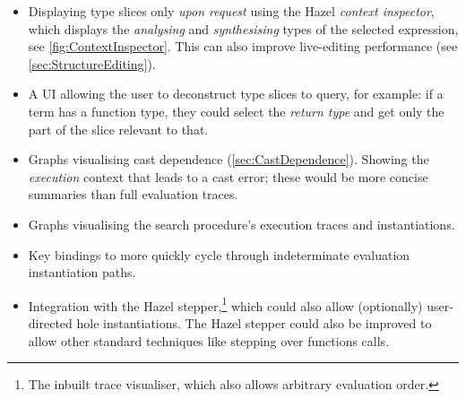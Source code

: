 \begin{itemize}
\item Displaying type slices only \textit{upon request} using the Hazel \textit{context inspector}, which displays the \textit{analysing} and \textit{synthesising} types of the selected expression, see \cref{fig:ContextInspector}. This can also improve live-editing performance (see \cref{sec:StructureEditing}).
\item A UI allowing the user to deconstruct type slices to query, for example: if a term has a function type, they could select the \textit{return type} and get only the part of the slice relevant to that.
\item Graphs visualising cast dependence (\cref{sec:CastDependence}). Showing the \textit{execution} context that leads to a cast error; these would be more concise summaries than full evaluation traces.
\item Graphs visualising the search procedure's execution traces and instantiations.
\item Key bindings to more quickly cycle through indeterminate evaluation instantiation paths.
\item Integration with the Hazel stepper,\footnote{The inbuilt trace visualiser, which also allows arbitrary evaluation order.} which could also allow (optionally) user-directed hole instantiations. The Hazel stepper could also be improved to allow other standard techniques like stepping over functions calls.
\end{itemize}
